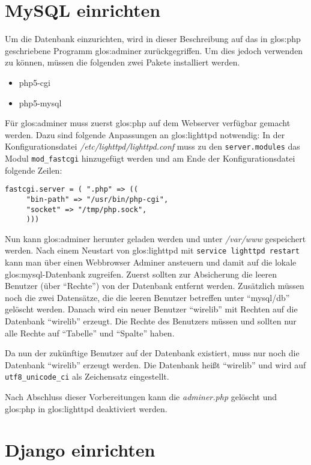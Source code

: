 \section{MySQL einrichten}
Um die Datenbank einzurichten, wird in dieser Beschreibung auf das in
\Gls{glos:php} geschriebene Programm \Gls{glos:adminer} zurückgegriffen.
Um dies jedoch verwenden zu können, müssen die folgenden zwei Pakete installiert
werden.

\begin{itemize}
  \item php5-cgi
  \item php5-mysql
\end{itemize}

Für \Gls{glos:adminer} muss zuerst \Gls{glos:php} auf dem Webserver verfügbar
gemacht werden. Dazu sind folgende Anpassungen an \Gls{glos:lighttpd}
notwendig:
In der Konfigurationsdatei \emph{/etc/lighttpd/lighttpd.conf} muss zu den
\lstinline{server.modules} das Modul \lstinline{mod_fastcgi} hinzugefügt
werden und am Ende der Konfigurationsdatei folgende Zeilen:

\begin{lstlisting}
fastcgi.server = ( ".php" => (( 
     "bin-path" => "/usr/bin/php-cgi",
     "socket" => "/tmp/php.sock",
     )))
\end{lstlisting}

Nun kann \Gls{glos:adminer} herunter geladen werden und unter \emph{/var/www}
gespeichert werden. Nach einem Neustart von \Gls{glos:lighttpd} mit
\lstinline{service lighttpd restart} kann man über einen Webbrowser Adminer
ansteuern und damit auf die lokale \Gls{glos:mysql}-Datenbank zugreifen. Zuerst
sollten zur Absicherung die leeren Benutzer (über "`Rechte"') von der Datenbank
entfernt werden. Zusätzlich müssen noch die zwei Datensätze, die die leeren
Benutzer betreffen unter "`mysql/db"' gelöscht werden.  Danach wird ein neuer
Benutzer "`wirelib"' mit Rechten auf die Datenbank "`wirelib"' erzeugt. Die
Rechte des Benutzers müssen und sollten nur alle Rechte auf "`Tabelle"' und "`Spalte"'
haben.

Da nun der zukünftige Benutzer auf der Datenbank existiert, muss nur noch die
Datenbank "`wirelib"' erzeugt werden. Die Datenbank heißt "`wirelib"' und
wird auf \lstinline{utf8_unicode_ci} als Zeichensatz eingestellt.

Nach Abschluss dieser Vorbereitungen kann die \emph{adminer.php} gelöscht und
\Gls{glos:php} in \Gls{glos:lighttpd} deaktiviert werden.

\section{Django einrichten}

